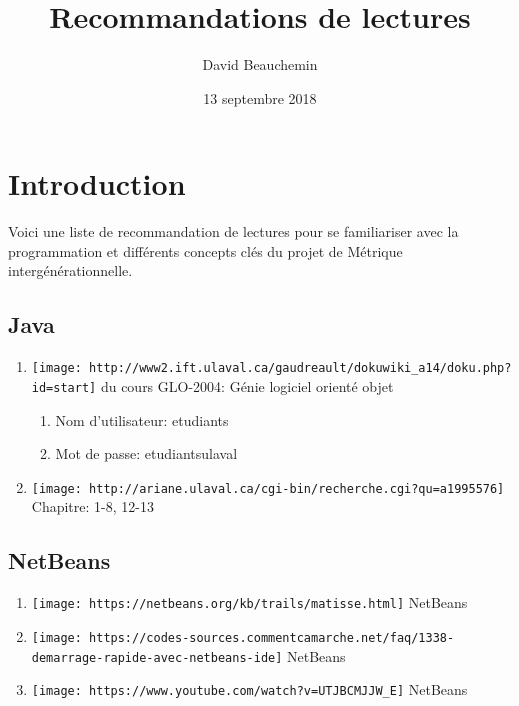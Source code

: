 \documentclass[]{article}
\title{Recommandations de lectures}
\author{David Beauchemin}
\date{13 septembre 2018}
\providecommand{\tightlist}{%
  \setlength{\itemsep}{0pt}\setlength{\parskip}{0pt}}
\begin{document}
\maketitle

\section{Introduction}\label{introduction}

Voici une liste de recommandation de lectures pour se familiariser avec
la programmation et différents concepts clés du projet de Métrique
intergénérationnelle.

\subsection{Java}\label{java}

\begin{enumerate}
\def\labelenumi{\arabic{enumi}.}
\tightlist
\item
  \texttt{[image: http://www2.ift.ulaval.ca/gaudreault/dokuwiki\_a14/doku.php?id=start]}
  du cours GLO-2004: Génie logiciel orienté objet

  \begin{enumerate}
  \def\labelenumii{\arabic{enumii}.}
  \tightlist
  \item
    Nom d'utilisateur: etudiants
  \item
    Mot de passe: etudiantsulaval
  \end{enumerate}
\item
  \texttt{[image: http://ariane.ulaval.ca/cgi-bin/recherche.cgi?qu=a1995576]}
  Chapitre: 1-8, 12-13
\end{enumerate}

\subsection{NetBeans}\label{netbeans}

\begin{enumerate}
\def\labelenumi{\arabic{enumi}.}
\tightlist
\item
  \texttt{[image: https://netbeans.org/kb/trails/matisse.html]} NetBeans
\item
  \texttt{[image: https://codes-sources.commentcamarche.net/faq/1338-demarrage-rapide-avec-netbeans-ide]}
  NetBeans
\item
  \texttt{[image: https://www.youtube.com/watch?v=UTJBCMJJW\_E]} NetBeans
\end{enumerate}
\end{document}
